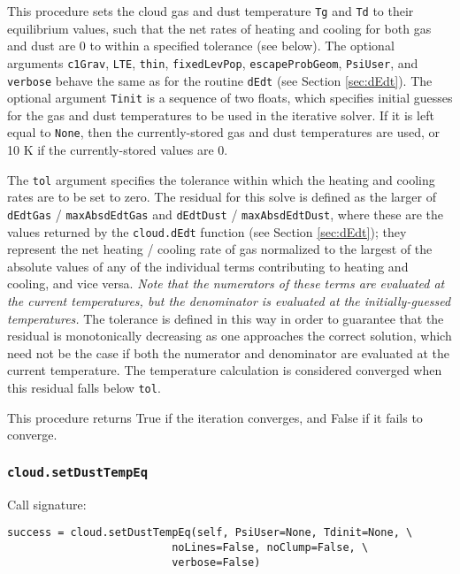 \documentclass[12pt]{article}
\begin{document}
This procedure sets the cloud gas and dust temperature \verb=Tg= and \verb=Td= to their equilibrium values, such that the net rates of heating and cooling for both gas and dust are 0 to within a specified tolerance (see below). The optional arguments \verb=c1Grav=, \verb=LTE=, \verb=thin=, \verb=fixedLevPop=, \verb=escapeProbGeom=, \verb=PsiUser=, and \verb=verbose= behave the same as for the routine \verb=dEdt= (see Section \ref{sec:dEdt}). The optional argument \verb=Tinit= is a sequence of two floats, which specifies initial guesses for the gas and dust temperatures to be used in the iterative solver. If it is left equal to \verb=None=, then the currently-stored gas and dust temperatures are used, or 10 K if the currently-stored values are 0.

The \verb=tol= argument specifies the tolerance within which the heating and cooling rates are to be set to zero. The residual for this solve is defined as the larger of \verb=dEdtGas= / \verb=maxAbsdEdtGas= and \verb=dEdtDust= / \verb=maxAbsdEdtDust=, where these are the values returned by the \verb=cloud.dEdt= function (see Section \ref{sec:dEdt}); they represent the net heating / cooling rate of gas normalized to the largest of the absolute values of any of the individual terms contributing to heating and cooling, and vice versa. \textit{Note that the numerators of these terms are evaluated at the current temperatures, but the denominator is evaluated at the initially-guessed temperatures.} The tolerance is defined in this way in order to guarantee that the residual is monotonically decreasing as one approaches the correct solution, which need not be the case if both the numerator and denominator are evaluated at the current temperature. The temperature calculation is considered converged when this residual falls below \verb=tol=.

This procedure returns True if the iteration converges, and False if it fails to converge.

\subsubsection{\texttt{cloud.setDustTempEq}}

Call signature:

\begin{verbatim}
success = cloud.setDustTempEq(self, PsiUser=None, Tdinit=None, \
                          noLines=False, noClump=False, \
                          verbose=False)
\end{verbatim}
\end{document}
